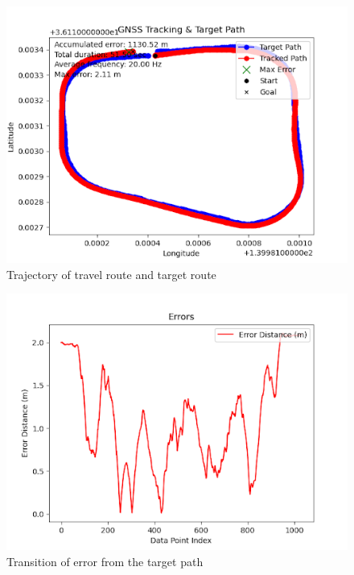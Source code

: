 \begin{figure}[H]
     \centering
    \includegraphics[keepaspectratio, scale=0.7]
         {images/6mspath2.png}
    \caption{Trajectory of travel route and target route}
    \label{fig:path}
\end{figure}

\begin{figure}[H]
     \centering
    \includegraphics[keepaspectratio, scale=0.7]
         {images/6mserror.png}
    \caption{Transition of error from the target path}
    \label{fig:path}
\end{figure}

